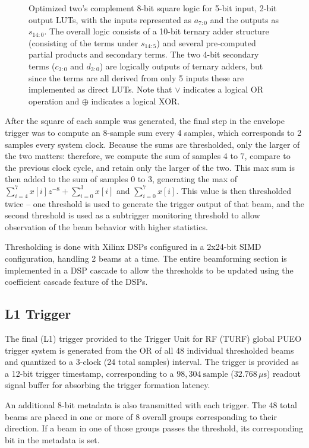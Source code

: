 \documentclass{IEEEtran}
\begin{document}
\begin{figure}
\caption{Optimized two's complement 8-bit square logic for 5-bit
input, 2-bit output LUTs, with the inputs represented as $a_{7:0}$
and the outputs as $s_{14:0}$. The overall logic consists of a 10-bit
ternary adder structure (consisting of the terms under $s_{14:5}$) and 
several pre-computed partial products and secondary terms. The two 4-bit
secondary terms ($c_{3:0}$ and $d_{3:0}$) are logically outputs of
ternary adders, but since the terms are all derived from only 5 inputs
these are implemented as direct LUTs. Note that $\lor$ indicates a logical
OR operation and $\oplus$ indicates a logical XOR.}
\end{figure}

After the square of each sample was generated, the final step
in the envelope trigger was to compute an 8-sample sum every 4 samples,
which corresponds to 2 samples every system clock. Because the sums
are thresholded, only the larger of the two matters: therefore,
we compute the sum of samples 4 to 7,  compare to the previous
clock cycle, and retain only the larger of the two. This max sum
is then added to the sum of samples 0 to 3, generating the max of
$\sum_{i=4}^{7}x\left[i\right]z^{-8}+\sum_{i=0}^{3}x\left[i\right]$
and $\sum_{i=0}^{7}x\left[i\right]$. This value is then thresholded
twice -- one threshold is used to generate the trigger output of
that beam, and the second threshold is used as a subtrigger
monitoring threshold to allow observation of the beam behavior with
higher statistics.

Thresholding is done with Xilinx DSPs configured in a 2x24-bit SIMD
configuration, handling 2 beams at a time. The entire beamforming
section is implemented in a DSP cascade to allow the thresholds to
be updated using the coefficient cascade feature of the DSPs.

\subsection{L1 Trigger}

The final (L1) trigger provided to the Trigger Unit for RF (TURF)
global PUEO trigger system is generated from the OR of all 48 individual
thresholded beams and quantized to a 3-clock (24 total samples)
interval. The trigger is provided as a 12-bit trigger timestamp, 
corresponding to a $98,304~\textrm{sample}$ ($32.768\,\mu\textrm{s}$) 
readout signal buffer for absorbing the trigger formation latency.

An additional 8-bit metadata is also transmitted with each trigger. 
The 48 total beams are placed in one or more of 8 overall groups
corresponding to their direction. If a beam in one of those groups 
passes the threshold, its corresponding bit in the metadata is set.
\end{document}
